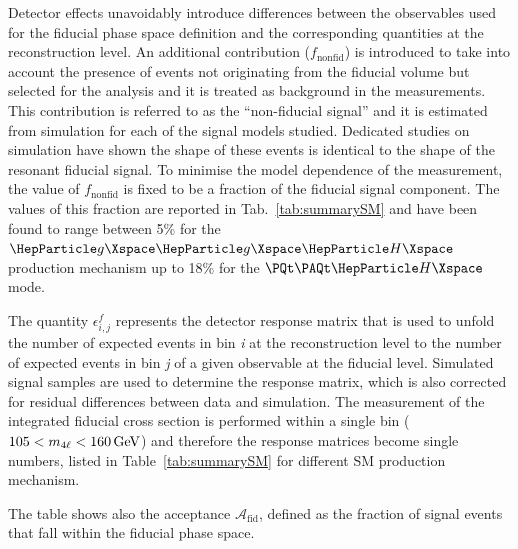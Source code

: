 { Detector effects unavoidably introduce differences between the observables used for the fiducial phase space definition and the corresponding quantities at the reconstruction level. 
An additional contribution ($f_{\mathrm{nonfid}}$) is introduced to take into account the presence of events not originating from the fiducial volume but selected for the analysis and it is treated as background in the measurements.
This contribution is referred to as the ``non-fiducial signal'' and it is estimated from simulation for each of the signal models studied.
Dedicated studies on simulation have shown the shape of these events is identical to the shape of the resonant fiducial signal. To minimise the model dependence of the measurement, the value of $f_{\mathrm{nonfid}}$ is fixed to be a fraction of the fiducial signal component.
The values of this fraction are reported in Tab.~\ref{tab:summarySM} and have been found to range between 5\% for the $\ggH$ production mechanism up to 18\% for the $\ttH$ mode.\par}

The quantity $\epsilon_{i,j}^{f}$ represents the detector response matrix that is used to unfold the number of expected events in bin \textit{i} at the reconstruction level to the number of expected events in bin \textit{j} of a given observable at the fiducial level.
Simulated signal samples are used to determine the response matrix, which is also corrected for residual differences between data and simulation.
The measurement of the integrated fiducial cross section is performed within a single bin ($105<m_{4\ell}<160\,\text{Ge\hspace{-.08em}V}$) and therefore the response matrices become single numbers, listed in Table~\ref{tab:summarySM} for different SM production mechanism.

The table shows also the acceptance $\mathcal{A}_{\mathrm{fid}}$, defined as the fraction of signal events that fall within the fiducial phase space.

